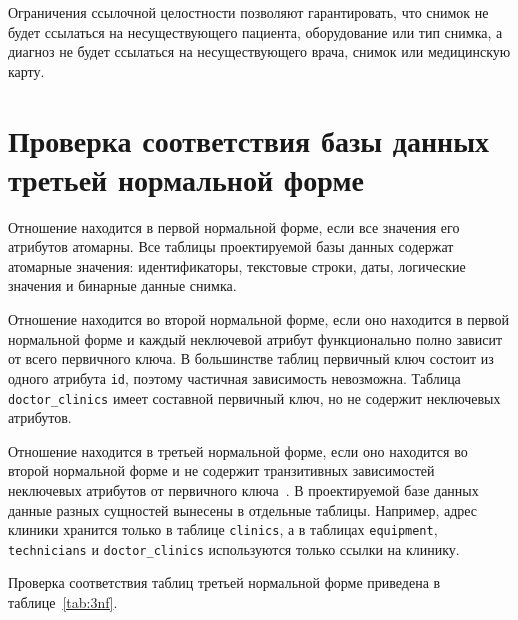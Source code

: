 Ограничения ссылочной целостности позволяют гарантировать, что снимок не будет ссылаться на несуществующего пациента, оборудование или тип снимка, а диагноз не будет ссылаться на несуществующего врача, снимок или медицинскую карту.

\section{Проверка соответствия базы данных третьей нормальной форме}

Отношение находится в первой нормальной форме, если все значения его атрибутов атомарны. Все таблицы проектируемой базы данных содержат атомарные значения: идентификаторы, текстовые строки, даты, логические значения и бинарные данные снимка.

Отношение находится во второй нормальной форме, если оно находится в первой нормальной форме и каждый неключевой атрибут функционально полно зависит от всего первичного ключа. В большинстве таблиц первичный ключ состоит из одного атрибута \texttt{id}, поэтому частичная зависимость невозможна. Таблица \texttt{doctor\_clinics} имеет составной первичный ключ, но не содержит неключевых атрибутов.

Отношение находится в третьей нормальной форме, если оно находится во второй нормальной форме и не содержит транзитивных зависимостей неключевых атрибутов от первичного ключа~\cite{date-db}. В проектируемой базе данных данные разных сущностей вынесены в отдельные таблицы. Например, адрес клиники хранится только в таблице \texttt{clinics}, а в таблицах \texttt{equipment}, \texttt{technicians} и \texttt{doctor\_clinics} используются только ссылки на клинику.

Проверка соответствия таблиц третьей нормальной форме приведена в таблице~\ref{tab:3nf}.

